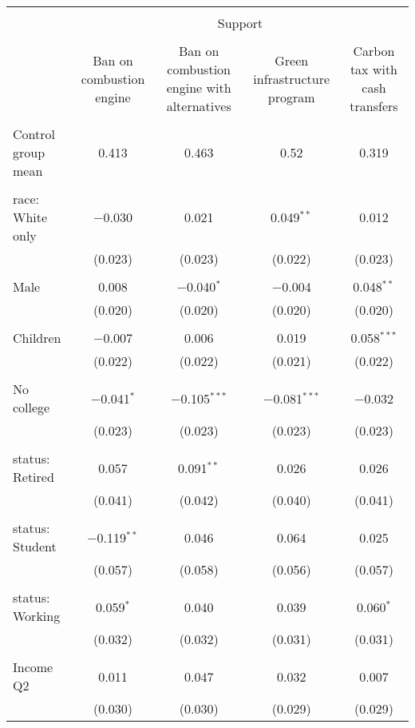 
\begin{tabular}{@{\extracolsep{5pt}}lcccc} 
\\[-1.8ex]\hline 
\hline \\[-1.8ex] 
 & \multicolumn{4}{c}{Support} \\ 
\cline{2-5} 
\\[-1.8ex] & Ban on combustion engine & Ban on combustion engine with alternatives & Green infrastructure program & Carbon tax with cash transfers \\ 
\hline \\[-1.8ex] 
 Control group mean & 0.413 & 0.463 & 0.52 & 0.319  \\ \hline \\[-1.8ex] race: White only & $-$0.030 & 0.021 & 0.049$^{**}$ & 0.012 \\ 
  & (0.023) & (0.023) & (0.022) & (0.023) \\ 
  & & & & \\ 
 Male & 0.008 & $-$0.040$^{*}$ & $-$0.004 & 0.048$^{**}$ \\ 
  & (0.020) & (0.020) & (0.020) & (0.020) \\ 
  & & & & \\ 
 Children & $-$0.007 & 0.006 & 0.019 & 0.058$^{***}$ \\ 
  & (0.022) & (0.022) & (0.021) & (0.022) \\ 
  & & & & \\ 
 No college & $-$0.041$^{*}$ & $-$0.105$^{***}$ & $-$0.081$^{***}$ & $-$0.032 \\ 
  & (0.023) & (0.023) & (0.023) & (0.023) \\ 
  & & & & \\ 
 status: Retired & 0.057 & 0.091$^{**}$ & 0.026 & 0.026 \\ 
  & (0.041) & (0.042) & (0.040) & (0.041) \\ 
  & & & & \\ 
 status: Student & $-$0.119$^{**}$ & 0.046 & 0.064 & 0.025 \\ 
  & (0.057) & (0.058) & (0.056) & (0.057) \\ 
  & & & & \\ 
 status: Working & 0.059$^{*}$ & 0.040 & 0.039 & 0.060$^{*}$ \\ 
  & (0.032) & (0.032) & (0.031) & (0.031) \\ 
  & & & & \\ 
 Income Q2 & 0.011 & 0.047 & 0.032 & 0.007 \\ 
  & (0.030) & (0.030) & (0.029) & (0.029) \\ 

\end{tabular}
